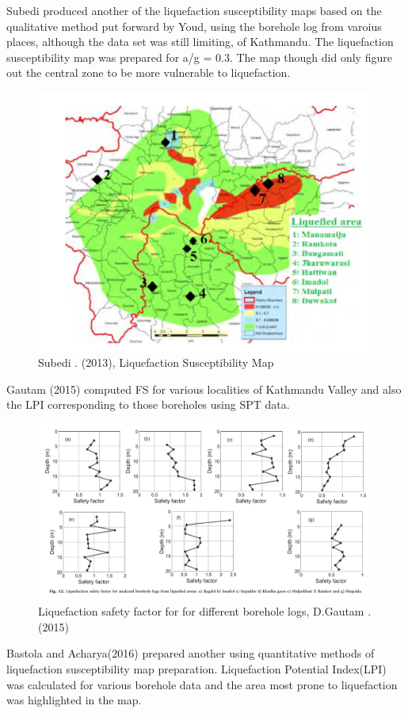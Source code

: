 Subedi\cite{r28} produced another of the liquefaction susceptibility maps based on the qualitative method put forward by Youd\cite{r27}, using the borehole log from varoius places, although the data set was still limiting, of Kathmandu. The liquefaction susceptibility map was prepared for a/g = 0.3. The map though did only figure out the central zone to be more vulnerable to liquefaction. 
 
 
\begin{figure}[!hbt]
\centering
\includegraphics[width=0.75\linewidth,keepaspectratio]{images/main/dipendra.png}
\caption{Subedi . (2013), Liquefaction Susceptibility Map}
\end{figure}

Gautam (2015)\cite{r18} computed FS for various localities of Kathmandu Valley and also the LPI corresponding to those boreholes using SPT data.

\begin{figure}[!hbt]
\centering
\includegraphics[width=0.75\linewidth,keepaspectratio]{images/main/bastola_acharya.png}
\caption{Liquefaction safety factor for for different borehole logs, D.Gautam .(2015)}
\end{figure}

Bastola and Acharya(2016)\cite{r31} prepared another using quantitative methods of  liquefaction susceptibility map preparation. Liquefaction Potential Index(LPI) was calculated for various borehole data and the area most prone to liquefaction was highlighted in the map. 

